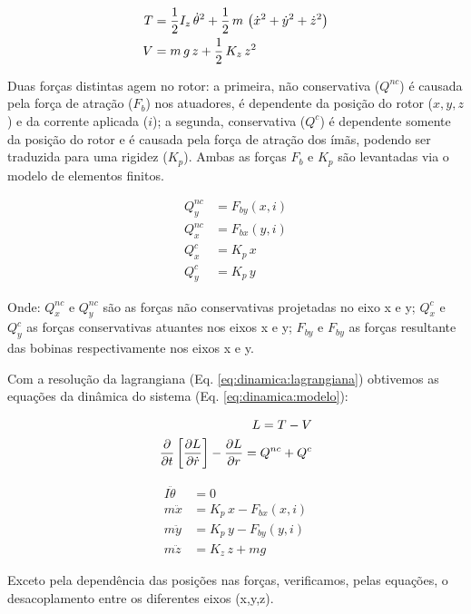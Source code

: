  \begin{align}
 	T &= \frac{1}{2} I_z \, \dot{\theta}^2 + \frac{1}{2} \, m \, \left( \dot{x}^2 + \dot{y}^2 + \dot{z}^2 \right) \notag \\
 	V &= m \, g \, z + \frac{1}{2} \, K_z \, z^2
 \end{align}	
 	
 Duas forças distintas agem no rotor: a primeira, não conservativa ($Q^{nc}$) é causada pela força de atração ($F_b$) nos atuadores, é dependente da posição do rotor ($x,y,z$) e da corrente aplicada ($i$); a segunda, conservativa ($Q^{c}$) é dependente somente da posição do rotor e é causada pela força de atração dos ímãs, podendo ser traduzida para uma rigidez ($K_p$). Ambas as forças $F_b$ e $K_p$ são levantadas via o modelo de elementos finitos. 
	 	
 \begin{align}
 	Q_y^{nc} &= F_{by}(x,i)  \\
 	Q_x^{nc} &= F_{bx}(y,i)  \\
 	Q^{c}_x  &= K_p \, x \\
 	Q^{c}_y  &= K_p \, y 
 \end{align}
 
 Onde: $Q_x^{nc}$ e $Q_y^{nc}$ são as forças não conservativas projetadas no eixo x e y; $Q^{c}_x$ e $Q^{c}_y$ as forças conservativas atuantes nos eixos x e y;  $F_{by}$ e $F_{by}$ as forças resultante das bobinas respectivamente nos eixos x e y.
  
 Com a resolução da lagrangiana (Eq. \ref{eq:dinamica:lagrangiana}) obtivemos as equações da dinâmica do sistema (Eq. \ref{eq:dinamica:modelo}):
  
   \begin{align}
   		L = T - V \notag \\
   		\frac{\partial}{\partial t} \left[ \frac{\partial L}{\partial \dot{r}} \right] -  \frac{\partial L}{\partial r} = Q^{nc} + Q^{c}
   		\label{eq:dinamica:lagrangiana}
   \end{align}
  
 	\begin{align}
 	I \ddot{\theta} &= 0 \\
 	m \ddot{x}		&= K_p \, x  - F_{bx}(x,i) \\
 	m \ddot{y}		&= K_p \, y  - F_{by}(y,i) \label{eq:dinamica:rotor:radial}\\	
 	m \ddot{z}  	&= K_z \, z + m g 
 	\label{eq:dinamica:modelo}
 	\end{align}	
 
 Exceto pela dependência das posições nas forças, verificamos, pelas equações, o desacoplamento entre os diferentes eixos (x,y,z). 

